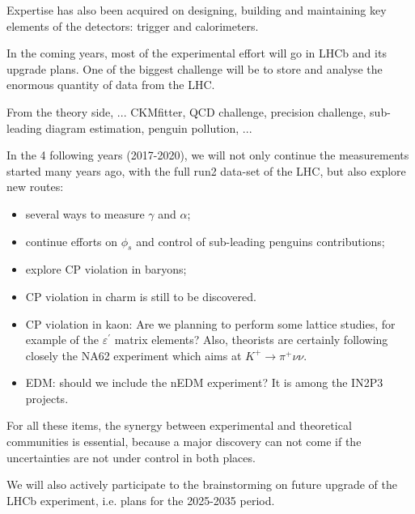 Expertise has also been acquired on designing, building and maintaining key
elements of the detectors: trigger and calorimeters.


In the coming years, most of the experimental effort will go in LHCb and its
upgrade plans. One of the biggest challenge will be to store and analyse the
enormous quantity of data from the LHC.

From the theory side, ... CKMfitter, QCD challenge, precision challenge,
sub-leading diagram estimation, penguin pollution, ...

In the 4 following years (2017-2020), we will not only continue the
measurements started many years ago, with the full run2 data-set of the LHC,
but also explore new routes:

\begin{itemize}
\item several ways to measure $\gamma$ and $\alpha$;

\item continue efforts on $\phi_{s}$ and control of sub-leading penguins contributions;

\item explore CP violation in baryons;

\item CP violation in charm is still to be discovered.

\item CP violation in kaon: Are we planning to perform some lattice studies,
for example of the $\varepsilon^{\prime}$ matrix elements? Also, theorists are
certainly following closely the NA62 experiment which aims at $K^{+}%
\rightarrow\pi^{+}\nu\nu$.

\item EDM: should we include the nEDM experiment? It is among the IN2P3 projects.
\end{itemize}

For all these items, the synergy between experimental and theoretical
communities is essential, because a major discovery can not come if the
uncertainties are not under control in both places.

We will also actively participate to the brainstorming on future upgrade of
the LHCb experiment, i.e. plans for the 2025-2035 period.

